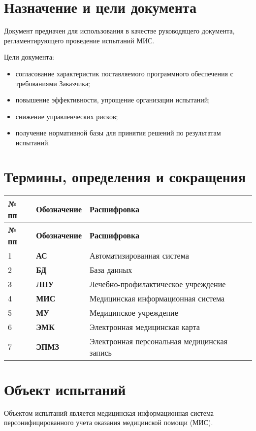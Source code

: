 \newpage
\section{Назначение и цели документа}
Документ предначен для использования в качестве руководящего документа, регламентирующего проведение испытаний МИС. 

Цели документа:
\begin{itemize}
\item согласование характеристик поставляемого программного обеспечения с требованиями Заказчика;
\item повышение эффективности, упрощение организации испытаний;
\item снижение управленческих рисков;
\item получение нормативной базы для принятия решений по результатам испытаний.
\end{itemize}

\section{Термины, определения и сокращения}
\begin{longtable}{|p{1cm}|p{5cm}|p{10.5cm}|}
\hline \rule{0pt}{15pt} \centering \textbf{№ пп} & \centering \textbf{Обозначение} & \hfil \textbf{Расшифровка} \\ \hline
\endfirsthead
\hline \rule{0pt}{15pt} \centering \textbf{№ пп} & \centering \textbf{Обозначение} & \hfil \textbf{Расшифровка} \\
\endhead
1 & \textbf{АС} & Автоматизированная система \\ \hline
2 & \textbf{БД} & База данных \\ \hline
3 & \textbf{ЛПУ} & Лечебно-профилактическое учреждение \\ \hline
4 & \textbf{МИС} & Медицинская информационная система\\ \hline
5 & \textbf{МУ} & Медицинское учреждение \\ \hline
6 & \textbf{ЭМК} & Электронная медицинская карта\\ \hline
7 & \textbf{ЭПМЗ} & Электронная персональная медицинская запись\\ \hline
\end{longtable}

\section{Объект испытаний}
Объектом испытаний является медицинская информационная система персонифицированного учета оказания медицинской помощи (МИС).

